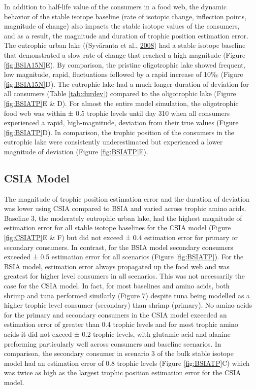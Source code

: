 \documentclass [11pt, proquest] {uwthesis}[2015/03/03]
\begin{document}
In addition to half-life value of the consumers in a food web, the
dynamic behavior of the stable isotope baseline (rate of isotopic
change, inflection points, magnitude of change) also impacts the stable
isotope values of the consumers, and as a result, the magnitude and
duration of trophic position estimation error. The eutrophic urban lake
((Syväranta et al., \protect\hyperlink{ref-Syvaranta2008}{2008}) had a
stable isotope baseline that demonstrated a slow rate of change that
reached a high magnitude (Figure \ref{fig:BSIA15N}E). By comparison, the
pristine oligotrophic lake showed frequent, low magnitude, rapid,
fluctuations followed by a rapid increase of 10‰ (Figure
\ref{fig:BSIA15N}D). The eutrophic lake had a much longer duration of
deviation for all consumers (Table \ref{tab:durdev}) compared to the
oligotrophic lake (Figure \ref{fig:BSIATP}E \& D). For almost the entire
model simulation, the oligotrophic food web was within ± 0.5 trophic
levels until day 310 when all consumers experienced a rapid,
high-magnitude, deviation from their true values (Figure
\ref{fig:BSIATP}D). In comparison, the trophic position of the consumers
in the eutrophic lake were consistently underestimated but experienced a
lower magnitude of deviation (Figure \ref{fig:BSIATP}E).

\subsection{CSIA Model}\label{csia-model}

The magnitude of trophic position estimation error and the duration of
deviation was lower using CSIA compared to BSIA and varied across
trophic amino acids. Baseline 3, the moderately eutrophic urban lake,
had the highest magnitude of estimation error for all stable isotope
baselines for the CSIA model (Figure \ref{fig:CSIATP}E \& F) but did not
exceed ± 0.4 estimation error for primary or secondary consumers. In
contrast, for the BSIA model secondary consumers exceeded ± 0.5
estimation error for all scenarios (Figure \ref{fig:BSIATP}). For the
BSIA model, estimation error always propagated up the food web and was
greatest for higher level consumers in all scenarios. This was not
necessarily the case for the CSIA model. In fact, for most baselines and
amino acids, both shrimp and tuna performed similarly (Figure 7) despite
tuna being modelled as a higher trophic level consumer (secondary) than
shrimp (primary). No amino acids for the primary and secondary consumers
in the CSIA model exceeded an estimation error of greater than 0.4
trophic levels and for most trophic amino acids it did not exceed ± 0.2
trophic levels, with glutamic acid and alanine preforming particularly
well across consumers and baseline scenarios. In comparison, the
secondary consumer in scenario 3 of the bulk stable isotope model had an
estimation error of 0.8 trophic levels (Figure \ref{fig:BSIATP}C) which
was twice as high as the largest trophic position estimation error for
the CSIA model.
\end{document}
